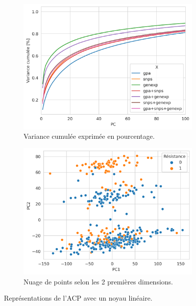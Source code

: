\documentclass[11pt]{article}
\begin{document}
  \begin{figure}[H]
    \centering
    \begin{subfigure}[b]{0.49\textwidth}
      \centering
      \includegraphics[width=\textwidth]{pca_var}
      \caption{Variance cumulée exprimée en pourcentage.}
      \label{fig:pca_var}
    \end{subfigure}
    \hfill
    \begin{subfigure}[b]{0.49\textwidth}
      \centering
      \includegraphics[width=\textwidth]{pca}
      \caption{Nuage de points selon les 2 premières dimensions.}
      \label{fig:pca_proj}
    \end{subfigure}
    \hfill
    \caption{Représentations de l'ACP avec un noyau linéaire.}
    \label{fig:pca}
  \end{figure}
\end{document}
